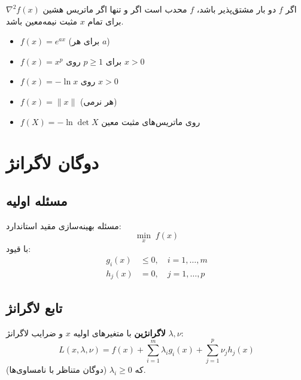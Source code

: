 \documentclass{matinbook}
\begin{document}
    \begin{theorem}
        اگر $f$ دو بار مشتق‌پذیر باشد،
        $f$ محدب است اگر و تنها اگر
        ماتریس هشین $\nabla^{2}f(x)$
        برای تمام $x$ مثبت نیمه‌معین باشد.
        \label{thm:second-order-convexity}
    \end{theorem}
    
    \begin{example}
        \begin{itemize}
            \item $f(x) = e^{ax}$ (برای هر $a$)
            \item $f(x) = x^{p}$ برای $p \geq 1$ روی $x > 0$
            \item $f(x) = -\ln x$ روی $x > 0$
            \item $f(x) = \|x\|$ (هر نرمی)
            \item $f(X) = -\ln \det X$ روی ماتریس‌های مثبت معین
        \end{itemize}
        \label{ex:convex-functions}
    \end{example}
    
    \section{دوگان لاگرانژ}
    
    \subsection{مسئله اولیه}
    
    مسئله بهینه‌سازی مقید استاندارد:
    \[
    \min_{x} \; f(x)
    \]
    با قیود:
    \begin{align*}
        g_{i}(x) &\leq 0, \quad i = 1, \ldots, m \\
        h_{j}(x) &= 0, \quad j = 1, \ldots, p
    \end{align*}
    
    \subsection{تابع لاگرانژ}
    
    \begin{definition}[لاگرانژین]
        \textbf{لاگرانژین}
        با متغیرهای اولیه $x$ و
        ضرایب لاگرانژ $\lambda, \nu$:
        \[
        L(x, \lambda, \nu) = f(x) +
        \sum_{i=1}^{m} \lambda_{i} g_{i}(x) +
        \sum_{j=1}^{p} \nu_{j} h_{j}(x)
        \]
        که $\lambda_{i} \geq 0$ (دوگان متناظر
        با نامساوی‌ها).
        \label{def:lagrangian}
    \end{definition}
    
\end{document}
